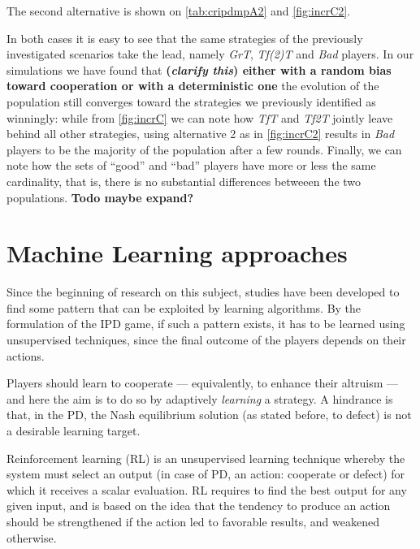\documentclass[journal,10pt,twoside]{IEEEtran}
\begin{document}

The second alternative is shown on \autoref{tab:cripdmpA2} and \autoref{fig:incrC2}.

In both cases it is easy to see that the same strategies of the previously investigated scenarios take the lead, namely \textit{GrT}, \textit{Tf(2)T} and \textit{Bad} players. In our simulations we have found that {\bf\color{red} (\textit{clarify this}) either with a random bias toward cooperation or with a deterministic one} the evolution of the population still converges toward the strategies we previously identified as winningly: while from \autoref{fig:incrC} we can note how \textit{TfT} and \textit{Tf2T} jointly leave behind all other strategies, using alternative 2 as in \autoref{fig:incrC2} results in \textit{Bad} players to be the majority of the population after a few rounds.
Finally, we can note how the sets of ``good'' and ``bad'' players have more or less the same cardinality, that is, there is no substantial differences betweeen the two populations.
\textbf{Todo maybe expand?}

\section{Machine Learning approaches} \label{s:ml}
Since the beginning of research on this subject, studies have been developed to find some pattern that can be exploited by learning algorithms.
By the formulation of the IPD game, if such a pattern exists, it has to be learned using unsupervised techniques, since the final outcome of the players depends on their actions.

Players should learn to cooperate --- equivalently, to enhance their altruism --- and here the aim is to do so by adaptively \textit{learning} a strategy. A hindrance is that, in the PD, the Nash equilibrium solution (as stated before, to defect) is not a desirable learning target.~\cite{coopSeqRL}

Reinforcement learning (RL) is an unsupervised learning technique whereby the system must select an output (in case of PD, an action: cooperate or defect) for which it receives a scalar evaluation. RL requires to find the best output for any given input, and is based on the idea that the tendency to produce an action should be strengthened if the action led to favorable results, and weakened otherwise.~\cite{sandholmRL}
\end{document}
